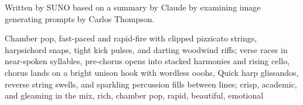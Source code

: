 
\begin{notes}
Written by SUNO based on a summary by Claude by examining image generating prompts by Carlos Thompson.
\end{notes}
\begin{style}
Chamber pop, fast-paced and rapid-fire with clipped pizzicato strings, harpsichord snaps, tight kick pulses, and darting woodwind riffs; verse races in near-spoken syllables, pre-chorus opens into stacked harmonies and rising cello, chorus lands on a bright unison hook with wordless ooohs, Quick harp glissandos, reverse string swells, and sparkling percussion fills between lines; crisp, academic, and gleaming in the mix, rich, chamber pop, rapid, beautiful, emotional
\end{style}
